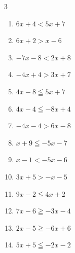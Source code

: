 \begin{multicols}{3}
\begin{enumerate}
  \item $6x+4<5x+7$

        \phantom{$\displaystyle x<3$}

  \item $6x+2>x-6$


  \item $-7x-8<2x+8$


\columnbreak %

  \item $-4x+4>3x+7$


  \item $4x-8\leqq 5x+7$

        \phantom{$\displaystyle x\geqq -15$}

  \item $4x-4\leqq -8x+4$


  \item $-4x-4>6x-8$


  \item $x+9\leqq -5x-7$


  \item $x-1<-5x-6$


  \item $3x+5>-x-5$


  \item $9x-2\leqq 4x+2$


  \item $7x-6\geqq -3x-4$


  \item $2x-5\geqq -6x+6$


  \item $5x+5\leqq -2x-2$


\end{enumerate}
\end{multicols}
